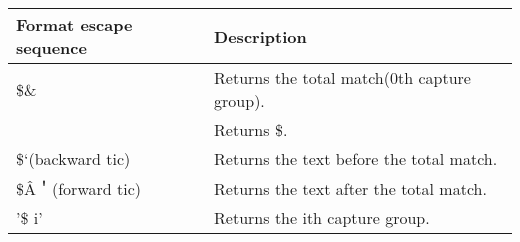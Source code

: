 \begin{longtable}[c]{|l|l|}
\hline
\textbf{Format escape sequence} & \textbf{Description}                        \\ \hline
\endfirsthead
%
\endhead
%
\$\&                            & Returns the total match(0th capture group). \\ \hline
$$                              & Returns \$.                                 \\ \hline
\$`(backward tic)               & Returns the text before the total match.    \\ \hline
\$\^{A}＇(forward tic) & Returns the text after the total match. \\ \hline
'\$ i'                          & Returns the ith capture group.              \\ \hline
\end{longtable}























